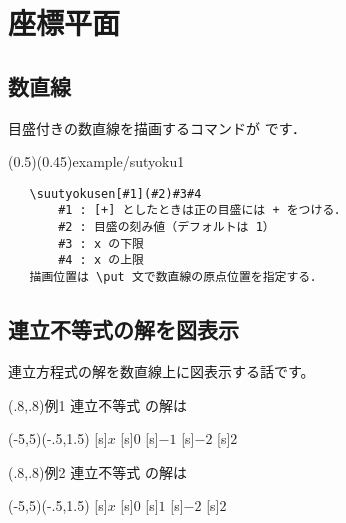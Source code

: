 \section{座標平面}
\subsection{数直線}
目盛付きの数直線を描画するコマンドが  です．

\showexample[数直線](0.5)(0.45){example/sutyoku1}

\begin{boxnote}
\begin{verbatim}
   \suutyokusen[#1](#2)#3#4
       #1 : [+] としたときは正の目盛には + をつける．
       #2 : 目盛の刻み値（デフォルトは 1）
       #3 : x の下限
       #4 : x の上限
   描画位置は \put 文で数直線の原点位置を指定する．
\end{verbatim}
\end{boxnote}

\subsection{連立不等式の解を図表示}
連立方程式の解を数直線上に図表示する話です。

{\drawaxisfalse
\begin{showEx}(.8,.8){例1}
  連立不等式
  の解は

\begin{zahyou}(-5,5)(-.5,1.5)%
%
[s]{$x$}%
[s]{$0$}%
[s]{$-1$}%
[s]{$-2$}%
[s]{$2$}%
\end{zahyou}
\end{showEx}

\begin{showEx}(.8,.8){例2}
  連立不等式
の解は

\begin{zahyou}(-5,5)(-.5,1.5)%
%
[s]{$x$}%
[s]{$0$}%
[s]{$1$}%
[s]{$-2$}%
[s]{$2$}%
\end{zahyou}
\end{showEx}
}

